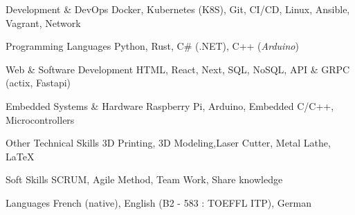 

\begin{cvskills}

	\cvskill
    {Development \& DevOps} %
    {Docker, Kubernetes (K8S), Git, CI/CD, Linux, Ansible, Vagrant, Network}

	\cvskill
	{Programming Languages} %
    {Python, Rust, C\# (.NET), C++ (\textit{Arduino})} %

    \cvskill
    {Web \& Software Development} %
    {HTML, React, Next, SQL, NoSQL, API \& GRPC (actix, Fastapi)} %

    \cvskill
    {Embedded Systems \& Hardware} %
    {Raspberry Pi, Arduino, Embedded C/C++, Microcontrollers}

	\cvskill
	{Other Technical Skills} %
    {3D Printing, 3D Modeling,Laser Cutter, Metal Lathe, LaTeX} %

	\cvskill
	{Soft Skills} %
	{SCRUM, Agile Method, Team Work, Share knowledge} %

	\cvskill
	{Languages} %
	{French (native), English (B2 - 583  : TOEFFL ITP), German} %

\end{cvskills}
